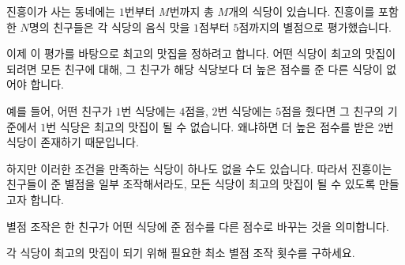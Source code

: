 진흥이가 사는 동네에는 $1$번부터 $M$번까지 총 $M$개의 식당이 있습니다.
진흥이를 포함한 $N$명의 친구들은 각 식당의 음식 맛을 $1$점부터 $5$점까지의 별점으로 평가했습니다.

이제 이 평가를 바탕으로 최고의 맛집을 정하려고 합니다.
어떤 식당이 최고의 맛집이 되려면 모든 친구에 대해, 그 친구가 해당 식당보다 더 높은 점수를 준 다른 식당이 없어야 합니다.

예를 들어, 어떤 친구가 $1$번 식당에는 $4$점을, $2$번 식당에는 $5$점을 줬다면
그 친구의 기준에서 $1$번 식당은 최고의 맛집이 될 수 없습니다. 왜냐하면 더 높은 점수를 받은 $2$번 식당이 존재하기 때문입니다.

하지만 이러한 조건을 만족하는 식당이 하나도 없을 수도 있습니다.
따라서 진흥이는 친구들이 준 별점을 일부 조작해서라도,
모든 식당이 최고의 맛집이 될 수 있도록 만들고자 합니다.

별점 조작은 한 친구가 어떤 식당에 준 점수를 다른 점수로 바꾸는 것을 의미합니다.

각 식당이 최고의 맛집이 되기 위해 필요한 최소 별점 조작 횟수를 구하세요.